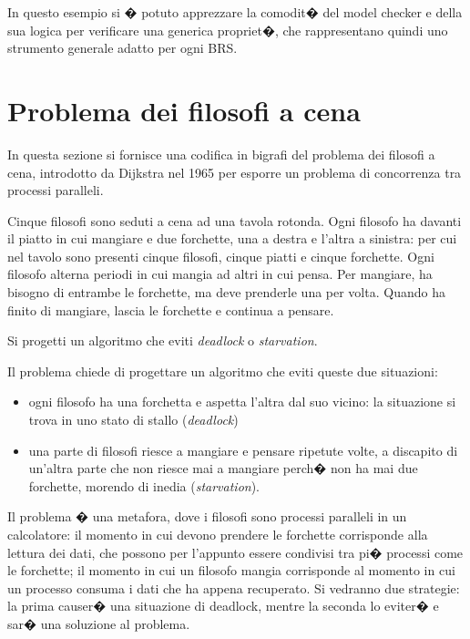 In questo esempio si � potuto apprezzare la comodit� del model checker e della sua logica per verificare una generica propriet�, che rappresentano quindi uno strumento generale adatto per ogni BRS.





\section{Problema dei filosofi a cena}
In questa sezione si fornisce una codifica in bigrafi del problema dei filosofi a cena, introdotto da Dijkstra nel 1965 per esporre un problema di concorrenza tra processi paralleli.

\begin{prop}
Cinque filosofi sono seduti a cena ad una tavola rotonda. Ogni filosofo ha davanti il piatto in cui mangiare e due forchette, una a destra e l'altra a sinistra: per cui nel tavolo sono presenti cinque filosofi, cinque piatti e cinque forchette. Ogni filosofo alterna periodi in cui mangia ad altri in cui pensa. Per mangiare, ha bisogno di entrambe le forchette, ma deve prenderle una per volta. Quando ha finito di mangiare, lascia le forchette e continua a pensare.

Si progetti un algoritmo che eviti \emph{deadlock} o \emph{starvation}.
\end{prop}

Il problema chiede di progettare un algoritmo che eviti queste due situazioni:
\begin{itemize}
	\item
	ogni filosofo ha una forchetta e aspetta l'altra dal suo vicino: la situazione si trova in uno stato di stallo (\emph{deadlock})
	\item
	una parte di filosofi riesce a mangiare e pensare ripetute volte, a discapito di un'altra parte che non riesce mai a mangiare perch� non ha mai due forchette, morendo di inedia (\emph{starvation}).
\end{itemize}

Il problema � una metafora, dove i filosofi sono processi paralleli in un calcolatore: il momento in cui devono prendere le forchette corrisponde alla lettura dei dati, che possono per l'appunto essere condivisi tra pi� processi come le forchette; il momento in cui un filosofo mangia corrisponde al momento in cui un processo consuma i dati che ha appena recuperato. Si vedranno due strategie: la prima causer� una situazione di deadlock, mentre la seconda lo eviter� e sar� una soluzione al problema.

